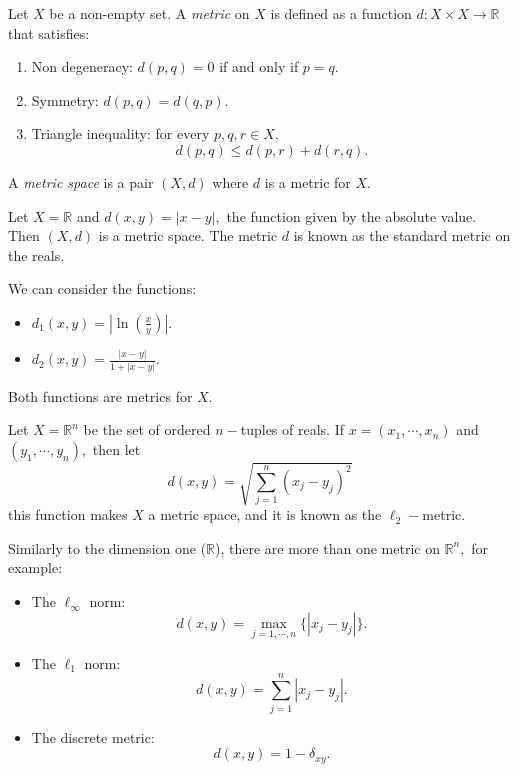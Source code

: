 \documentclass[
	fontsize=10pt, %
	twoside=false, %
	secnumdepth=1, %
]{kaobook}
\begin{document}
\begin{definition}
Let $X$ be a non-empty set. A \emph{metric} on $X$ is defined as a function $d:X\times X\to \mathbb{R}$ that satisfies:
\begin{enumerate}
\item Non degeneracy: $d(p,q)=0$ if and only if $p=q.$
\item Symmetry: $d(p,q)=d(q,p).$
\item Triangle inequality: for every $p,q,r\in X,$ $$d(p,q)\leq d(p,r)+d(r,q).$$
\end{enumerate}

A \emph{metric space} is a pair $(X,d)$ where $d$ is a metric for $X.$
\end{definition}
\begin{example}
Let $X=\mathbb{R}$ and $d(x,y)=|x-y|,$ the function given by the absolute value. Then $(X,d)$ is a metric space. The metric $d$ is known as the standard metric on the reals.

We can consider the functions:
\begin{itemize}
\item $d_1(x,y)=\left|\ln\left(\frac{x}{y}\right)\right|.$

\item $d_2(x,y)=\frac{|x-y|}{1+|x-y|}.$
\end{itemize}

Both functions are metrics for $X.$
\end{example}

\begin{example}
Let $X=\mathbb{R}^n$ be the set of ordered $n-$tuples of reals. If $x=(x_1,\cdots,x_n)$ and $(y_1,\cdots,y_n),$ then let $$d(x,y)=\sqrt{\sum_{j=1}^n (x_j-y_j)^2}$$ this function makes $X$ a metric space, and it is known as the $\ell_2-$metric.

Similarly to the dimension one ($\mathbb{R}$), there are more than one metric on $\mathbb{R}^n,$ for example:

\begin{itemize}
\item The $\ell_\infty$ norm: $$d(x,y)=\max_{j=1,\cdots,n} \{|x_j-y_j|\}.$$

\item The $\ell_1$ norm: $$d(x,y)=\sum_{j=1}^n |x_j-y_j|.$$

\item The discrete metric: $$d(x,y)=1-\delta_{xy}.$$
\end{itemize}
\end{example}
\end{document}
